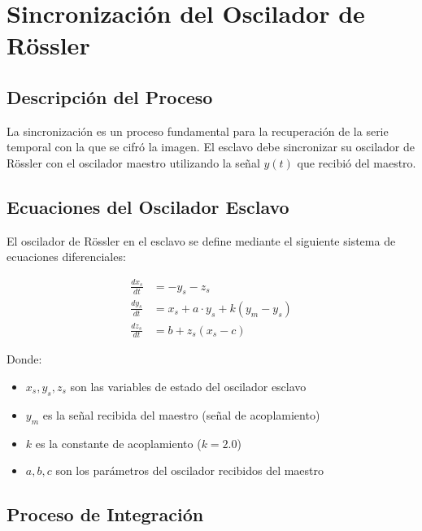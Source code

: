 \documentclass[12pt,a4paper]{article}
\begin{document}
	\section{Sincronización del Oscilador de Rössler}
	
	\subsection{Descripción del Proceso}
	
	La sincronización es un proceso fundamental para la recuperación de la serie temporal con la que se cifró la imagen. El esclavo debe sincronizar su oscilador de Rössler con el oscilador maestro utilizando la señal $y(t)$ que recibió del maestro.
	
	\subsection{Ecuaciones del Oscilador Esclavo}
	
	El oscilador de Rössler en el esclavo se define mediante el siguiente sistema de ecuaciones diferenciales:
	
	\begin{align}
		\frac{dx_s}{dt} &= -y_s - z_s \\
		\frac{dy_s}{dt} &= x_s + a \cdot y_s + k(y_m - y_s) \\
		\frac{dz_s}{dt} &= b + z_s(x_s - c)
	\end{align}
	
	Donde:
	\begin{itemize}
		\item $x_s, y_s, z_s$ son las variables de estado del oscilador esclavo
		\item $y_m$ es la señal recibida del maestro (señal de acoplamiento)
		\item $k$ es la constante de acoplamiento ($k = 2.0$)
		\item $a, b, c$ son los parámetros del oscilador recibidos del maestro
	\end{itemize}
	
	\subsection{Proceso de Integración}
	
\end{document}
